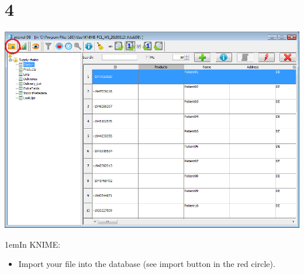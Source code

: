 \documentclass[10pt]{beamer}
\begin{document}
\section{4}
\begin{frame}
	\begin{center}
			\includegraphics[height=0.6\textheight]{4.png}
	\end{center}
\leftskip1em{In KNIME:}
	\begin{itemize}
		\item Import your file into the database (see import button in the red circle).
	\end{itemize}
\end{frame}
\end{document}
